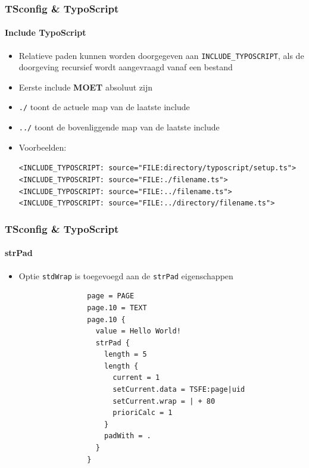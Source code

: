 
\begin{frame}[fragile]
	\frametitle{TSconfig \& TypoScript}
	\framesubtitle{Include TypoScript}

	\begin{itemize}
		\item Relatieve paden kunnen worden doorgegeven aan \texttt{INCLUDE\_TYPOSCRIPT},\newline
			als de doorgeving recursief wordt aangevraagd vanaf een bestand
		\item Eerste include \textbf{MOET} absoluut zijn
		\item \texttt{./} toont de actuele map van de laatste include
		\item \texttt{../} toont de bovenliggende map van de laatste include
		\item Voorbeelden:

			\lstinline!<INCLUDE_TYPOSCRIPT: source="FILE:directory/typoscript/setup.ts">!
			\lstinline!<INCLUDE_TYPOSCRIPT: source="FILE:./filename.ts">!
			\lstinline!<INCLUDE_TYPOSCRIPT: source="FILE:../filename.ts">!
			\lstinline!<INCLUDE_TYPOSCRIPT: source="FILE:../directory/filename.ts">!

	\end{itemize}

\end{frame}


\begin{frame}[fragile]
	\frametitle{TSconfig \& TypoScript}
	\framesubtitle{strPad}

	\begin{itemize}
		\item Optie \texttt{stdWrap} is toegevoegd aan de \texttt{strPad} eigenschappen

			\begin{lstlisting}
				page = PAGE
				page.10 = TEXT
				page.10 {
				  value = Hello World!
				  strPad {
				    length = 5
				    length {
				      current = 1
				      setCurrent.data = TSFE:page|uid
				      setCurrent.wrap = | + 80
				      prioriCalc = 1
				    }
				    padWith = .
				  }
				}
			\end{lstlisting}

	\end{itemize}

\end{frame}

